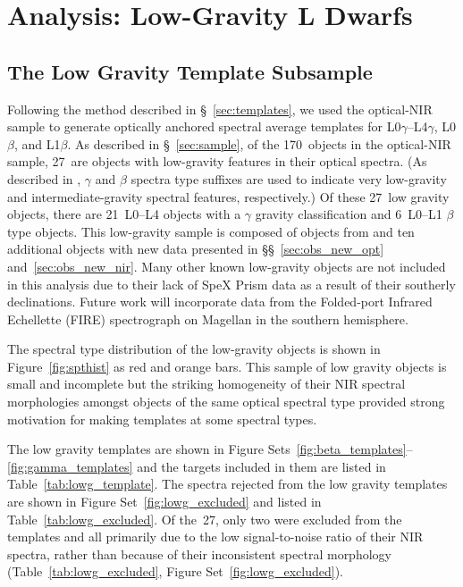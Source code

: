 \documentclass[12pt]{aastex6}
\newcommand{\sample}{170}
\newcommand{\optLowG}{27}
\newcommand{\optBeta}{6}
\newcommand{\optGamma}{21}
\begin{document}
\section{Analysis: Low-Gravity L Dwarfs}
\label{sec:lowg}

\subsection{The Low Gravity Template Subsample}
\label{sec:templates_lowg}

Following the method described in \S~\ref{sec:templates}, we used the optical-NIR sample to generate optically anchored spectral average templates for L0$\gamma$--L4$\gamma$, L0$\beta$, and L1$\beta$.
As described in \S~\ref{sec:sample}, of the \sample~objects in the optical-NIR sample, \optLowG~are objects with low-gravity features in their optical spectra.
(As described in \cite{Cruz09_lowg}, $\gamma$ and $\beta$ spectra type suffixes are used to indicate very low-gravity and intermediate-gravity spectral features, respectively.)
Of these \optLowG~low gravity objects, there are \optGamma~L0--L4 objects with a $\gamma$ gravity classification and \optBeta~L0--L1 $\beta$ type objects.
This low-gravity sample is composed of objects from \citet{Cruz07,Kirkpatrick08,Cruz09_lowg} and ten additional objects with new data presented in \S\S~\ref{sec:obs_new_opt} and~\ref{sec:obs_new_nir}.
Many other known low-gravity objects are not included in this analysis due to their lack of SpeX Prism data as a result of their southerly declinations.
Future work will incorporate data from the Folded-port Infrared Echellette (FIRE) spectrograph on Magellan \citep{Simcoe:2013kh} in the southern hemisphere.

The spectral type distribution of the low-gravity objects is shown in Figure~\ref{fig:spthist} as red and orange bars.
This sample of low gravity objects is small and incomplete but the striking homogeneity of their NIR spectral morphologies amongst objects of the same optical spectral type provided strong motivation for making templates at some spectral types.

The low gravity templates are shown in Figure Sets~\ref{fig:beta_templates}--\ref{fig:gamma_templates} and the targets included in them are listed in Table~\ref{tab:lowg_template}.
The spectra rejected from the low gravity templates are shown in Figure Set~\ref{fig:lowg_excluded} and listed in Table~\ref{tab:lowg_excluded}.
Of the~\optLowG, only two were excluded from the templates and all primarily due to the low signal-to-noise ratio of their NIR spectra, rather than because of their inconsistent spectral morphology (Table~\ref{tab:lowg_excluded}, Figure Set~\ref{fig:lowg_excluded}).
\end{document}
